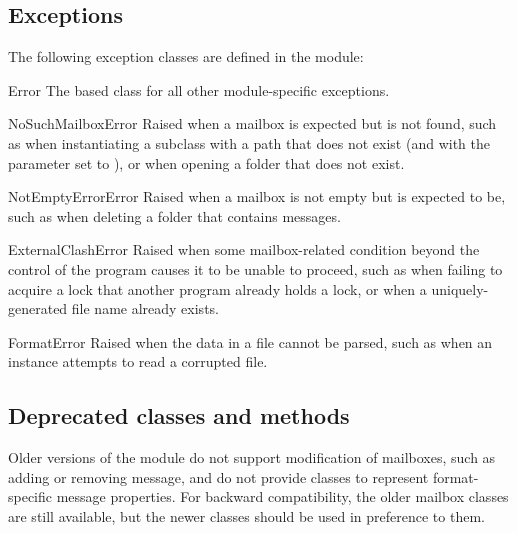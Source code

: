 \subsection{Exceptions}
\label{mailbox-deprecated}

The following exception classes are defined in the  module:

\begin{classdesc}{Error}{}
The based class for all other module-specific exceptions.
\end{classdesc}

\begin{classdesc}{NoSuchMailboxError}{}
Raised when a mailbox is expected but is not found, such as when instantiating
a  subclass with a path that does not exist (and with the
 parameter set to ), or when opening a folder that does
not exist.
\end{classdesc}

\begin{classdesc}{NotEmptyErrorError}{}
Raised when a mailbox is not empty but is expected to be, such as when deleting
a folder that contains messages.
\end{classdesc}

\begin{classdesc}{ExternalClashError}{}
Raised when some mailbox-related condition beyond the control of the program
causes it to be unable to proceed, such as when failing to acquire a lock that
another program already holds a lock, or when a uniquely-generated file name
already exists.
\end{classdesc}

\begin{classdesc}{FormatError}{}
Raised when the data in a file cannot be parsed, such as when an 
instance attempts to read a corrupted  file.
\end{classdesc}

\subsection{Deprecated classes and methods}
\label{mailbox-deprecated}

Older versions of the  module do not support modification of
mailboxes, such as adding or removing message, and do not provide classes to
represent format-specific message properties. For backward compatibility, the
older mailbox classes are still available, but the newer classes should be used
in preference to them.

